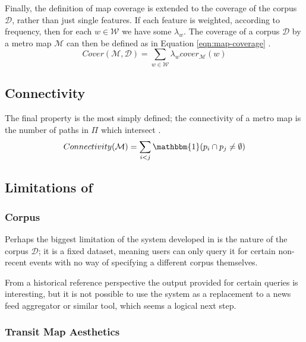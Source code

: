 Finally, the definition of map coverage is extended to the coverage of the corpus $\mathcal{D}$, rather than just single features. If each feature is weighted, according to frequency, then for each $w \in \mathcal{W}$ we have some $\lambda_w$. The coverage of a corpus $\mathcal{D}$ by a metro map $\mathcal{M}$ can then be defined as in Equation \ref{eqn:map-coverage} \citep{GeneratingInformationMaps}.
\begin{equation}
	\label{eqn:map-coverage}
	Cover(\mathcal{M}, \mathcal{D}) = \sum_{w \in \mathcal{W}}\lambda_w cover_\mathcal{M}(w)
\end{equation}

\subsection{Connectivity}
The final property is the most simply defined; the connectivity of a metro map is the number of paths in $\Pi$ which intersect \citep{GeneratingInformationMaps}.
\begin{equation}
	Connectivity(\mathcal{M}) = \sum_{i<j}\mathbbm{1}(p_i \cap p_j \neq\emptyset)
\end{equation}

\subsection{Limitations of \citep{GeneratingInformationMaps, InformationCartographyPre}}

\subsubsection{Corpus}
Perhaps the biggest limitation of the system developed in \citep{GeneratingInformationMaps, InformationCartographyPre} is the nature of the corpus $\mathcal{D}$; it is a fixed dataset, meaning users can only query it for certain non-recent events with no way of specifying a different corpus themselves. 

From a historical reference perspective the output provided for certain queries is interesting, but it is not possible to use the system as a replacement to a news feed aggregator or similar tool, which seems a logical next step.

\subsubsection{Transit Map Aesthetics}

